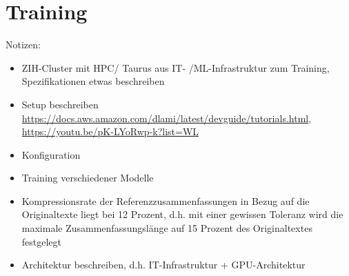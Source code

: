 \section{Training}
Notizen:
\begin{itemize}
	\item ZIH-Cluster mit HPC/ Taurus aus IT- /ML-Infrastruktur zum Training, Spezifikationen etwas beschreiben
	\item Setup beschreiben \url{https://docs.aws.amazon.com/dlami/latest/devguide/tutorials.html}, \url{https://youtu.be/pK-LYoRwp-k?list=WL}
	\item Konfiguration
	\item Training verschiedener Modelle
	\item Kompressionsrate der Referenzzusammenfassungen in Bezug auf die Originaltexte liegt bei 12 Prozent, d.h. mit einer gewissen Toleranz wird die maximale Zusammenfassungslänge auf 15 Prozent des Originaltextes festgelegt
	\item Architektur beschreiben, d.h. IT-Infrastruktur + GPU-Architektur
\end{itemize}


